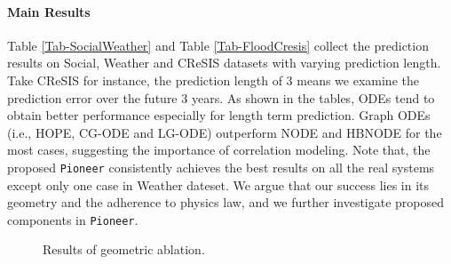 \paragraph{Main Results}
Table \ref{Tab-SocialWeather} and Table \ref{Tab-FloodCresis} collect the prediction results on Social, Weather and CReSIS datasets with varying prediction length.
Take CReSIS for instance, the prediction length of $3$ means we examine the prediction error over the future $3$ years.
As shown in the tables, ODEs tend to obtain better performance especially for length term prediction.
Graph ODEs (i.e., HOPE, CG-ODE and LG-ODE) outperform NODE and HBNODE for the most cases, suggesting the importance of correlation modeling.
Note that, the proposed \texttt{Pioneer} consistently achieves the best results on all the real systems except only one case in Weather dateset.
We argue that our success lies in its geometry and the adherence to physics law, and 
we further investigate  proposed components in \texttt{Pioneer}.






\begin{figure} 
\centering 
{}
\vspace{-0.1in}
\caption{Results of geometric ablation.}
\vspace{-0.1in}
\label{Fig-geometry}
\end{figure}



